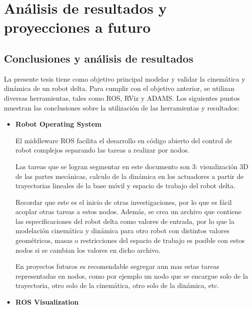 \chapter{Análisis de resultados y proyecciones a futuro}\label{CAP8}

\section{Conclusiones y análisis de resultados}
        La presente tesis tiene como objetivo principal modelar y validar la cinemática y dinámica de un robot delta. Para cumplir con el objetivo anterior, se utilizan diversas herramientas, tales como ROS, RViz y ADAMS. Los siguientes puntos muestran las conclusiones sobre la utilización de las herramientas y resultados:

        \begin{itemize}
            \item {\textbf{Robot Operating System}
            
            El middleware ROS facilita el desarrollo en código abierto del control de robot complejos separando las tareas a realizar por nodos. 
            
            Las tareas que se logran segmentar en este documento son 3: visualización 3D de las partes mecánicas, calculo de la dinámica en los actuadores a partir de trayectorias lineales de la base móvil  y espacio de trabajo del robot delta. 
            
            Recordar que este es el inicio de otras investigaciones, por lo que es fácil acoplar otras tareas a estos nodos. Además, se crea un archivo que contiene las especificaciones del robot delta como valores de entrada, por lo que la modelación cinemática y dinámica para otro robot con distintos valores geométricos, masas o restricciones del espacio de trabajo es posible con estos nodos si se cambian los valores en dicho archivo.
            
            En proyectos futuros es recomendable segregar aun mas estas tareas representadas en nodos, como por ejemplo un nodo que se encargue solo de la trayectoria, otro solo de la cinemática, otro solo de la dinámica, etc.
            \vspace{1cm}
            }
            
            \item {\textbf{ROS Visualization} 
            
}
\end{itemize}
